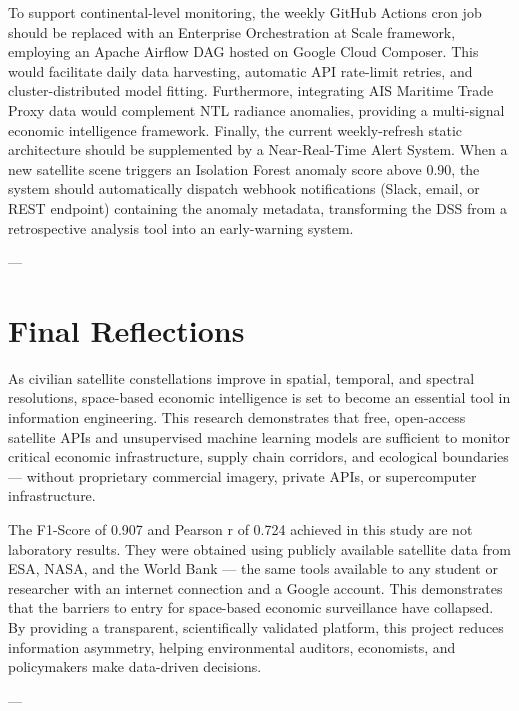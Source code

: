 To support continental-level monitoring, the weekly GitHub Actions cron job should be replaced with an Enterprise Orchestration at Scale framework, employing an Apache Airflow DAG hosted on Google Cloud Composer. This would facilitate daily data harvesting, automatic API rate-limit retries, and cluster-distributed model fitting. Furthermore, integrating AIS Maritime Trade Proxy data would complement NTL radiance anomalies, providing a multi-signal economic intelligence framework. Finally, the current weekly-refresh static architecture should be supplemented by a Near-Real-Time Alert System. When a new satellite scene triggers an Isolation Forest anomaly score above $0.90$, the system should automatically dispatch webhook notifications (Slack, email, or REST endpoint) containing the anomaly metadata, transforming the DSS from a retrospective analysis tool into an early-warning system.

---

\section{Final Reflections}
As civilian satellite constellations improve in spatial, temporal, and spectral resolutions, space-based economic intelligence is set to become an essential tool in information engineering. This research demonstrates that free, open-access satellite APIs and unsupervised machine learning models are sufficient to monitor critical economic infrastructure, supply chain corridors, and ecological boundaries — without proprietary commercial imagery, private APIs, or supercomputer infrastructure.

The F1-Score of 0.907 and Pearson r of 0.724 achieved in this study are not laboratory results. They were obtained using publicly available satellite data from ESA, NASA, and the World Bank — the same tools available to any student or researcher with an internet connection and a Google account. This demonstrates that the barriers to entry for space-based economic surveillance have collapsed. By providing a transparent, scientifically validated platform, this project reduces information asymmetry, helping environmental auditors, economists, and policymakers make data-driven decisions.

---

